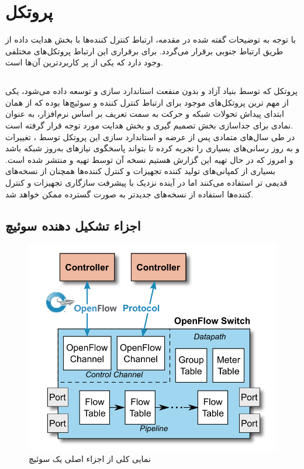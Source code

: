 \chapter{پروتکل }
با توجه به توضیحات گفته شده در مقدمه، ارتباط کنترل کننده‌ها با بخش هدایت داده از طریق ارتباط جنوبی برقرار می‌گردد. برای برقراری این ارتباط پروتکل‌های مختلفی وجود دارد که  یکی از پر کاربردترین آن‌ها است.

\section{}
پروتکل  که توسط بنیاد آزاد و بدون منفعت  استاندارد سازی و توسعه داده می‌شود، یکی از مهم ترین پروتکل‌های موجود برای ارتباط کنترل کننده و سوئیچ‌ها بوده که از همان ابتدای پیداش تحولات شبکه و حرکت به سمت تعریف بر اساس نرم‌افزار، به عنوان نمادی برای جداسازی بخش تصمیم گیری و بخش هدایت مورد توجه قرار گرفته است.\\
در طی سال‌های متمادی پس از عرضه و استاندارد سازی این پروتکل توسط ، تغییرات و به روز رسانی‌های بسیاری را تجربه کرده تا بتواند پاسخگوی نیاز‌های به‌روز شبکه باشد و امروز که در حال تهیه این گزارش هستیم نسخه  آن توسط  تهیه و منتشر شده است. بسیاری از کمپانی‌های تولید کننده تجهیزات  و کنترل کننده‌ها همچنان از نسخه‌های قدیمی تر استفاده می‌کنند اما در آینده نزدیک با پیشرفت سازگاری تجهیزات و کنترل کننده‌ها استفاده از نسخه‌های جدیدتر به صورت گسترده ممکن خواهد شد.

\section{اجزاء تشکیل دهنده سوئیچ }

\begin{figure}
	\centering
	\includegraphics[scale=0.4]{imgs/of_comp.png}
	\caption{نمایی کلی از اجزاء اصلی یک سوئیچ }
	\label{fig4}
\end{figure}

